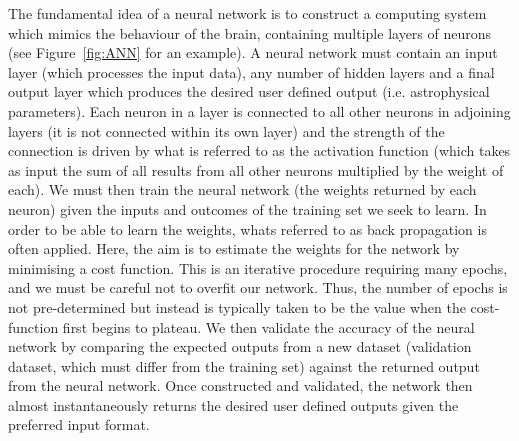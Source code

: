The fundamental idea of a neural network is to construct a computing system which mimics the behaviour of the brain, containing multiple layers of neurons (see Figure~\ref{fig:ANN} for an example). A neural network must contain an input layer (which processes the input data), any number of hidden layers and a final output layer which produces the desired user defined output (i.e. astrophysical parameters). Each neuron in a layer is connected to all other neurons in adjoining layers (it is not connected within its own layer) and the strength of the connection is driven by what is referred to as the activation function (which takes as input the sum of all results from all other neurons multiplied by the weight of each). We must then train the neural network (the weights returned by each neuron) given the inputs and outcomes of the training set we seek to learn. In order to be able to learn the weights, whats referred to as back propagation is often applied. Here, the aim is to estimate the weights for the network by minimising a cost function. This is an iterative procedure requiring many epochs, and we must be careful not to overfit our network. Thus, the number of epochs is not pre-determined but instead is typically taken to be the value when the cost-function first begins to plateau. We then validate the accuracy of the neural network by comparing the expected outputs from a new dataset (validation dataset, which must differ from the training set) against the returned output from the neural network. Once constructed and validated, the network then almost instantaneously returns the desired user defined outputs given the preferred input format.

